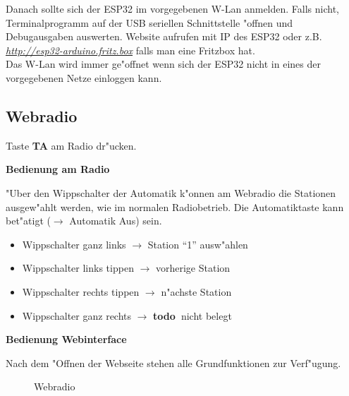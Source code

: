 \documentclass[ngerman,11pt,parskip=half] {scrartcl}
\newcommand {\todo} {\textbf{\color{red} todo\ }}
\begin{document}
Danach sollte sich der ESP32 im vorgegebenen W-Lan anmelden. Falls nicht, Terminalprogramm auf der USB seriellen Schnittstelle "offnen und Debugausgaben auswerten. Website aufrufen mit IP des ESP32 oder z.B. \emph{\href{http://esp32-arduino.fritz.box}{http://esp32-arduino.fritz.box}} falls man eine Fritzbox hat.\\
Das W-Lan wird immer ge"offnet wenn sich der ESP32 nicht in eines der vorgegebenen Netze einloggen kann.

\subsection{Webradio} \label{sec:bedienung:webradio}

Taste \textbf{TA} am Radio dr"ucken.

\textbf{Bedienung am Radio}

"Uber den Wippschalter der Automatik k"onnen am Webradio die Stationen ausgew"ahlt werden, wie im normalen Radiobetrieb. Die Automatiktaste kann bet"atigt ($\rightarrow$ Automatik Aus) sein.

\begin{itemize}
\item Wippschalter ganz links $\rightarrow$ Station "`1"' ausw"ahlen
\item Wippschalter links tippen $\rightarrow$ vorherige Station
\item Wippschalter rechts tippen $\rightarrow$ n"achste Station
\item Wippschalter ganz rechts $\rightarrow$ \todo nicht belegt
\end{itemize}

\textbf{Bedienung Webinterface}

Nach dem "Offnen der Webseite stehen alle Grundfunktionen zur Verf"ugung.

\begin{figure}[H]
\centering
{}
\caption{Webradio} \label{fig:1}
\end{figure}
\end{document}

